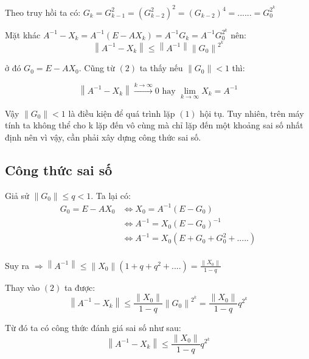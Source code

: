         \par Theo truy hồi ta có: $ G_{k} = G_{k-1}^{2} = (G_{k-2}^2)^2 = (G_{k-2})^4 = ...... = G_{0}^{2^{k}} $
        
        \par Mặt khác $A^{-1} - X_{k} = A^{-1}(E - AX_{k}) = A^{-1}G_{k} = A^{-1}G_0^{2^{k}}$ nên:
        \begin{equation}
            \left\lVert A^{-1} - X_{k} \right\rVert \leq \left\lVert A^{-1} \right\rVert \left\lVert G_{0} \right\rVert ^{2^{k}}
        \end{equation}
        \par ở đó $ G_{0} = E - AX_{0} $. Cũng từ $(2)$ ta thấy nếu $\left\lVert G_{0} \right\rVert < 1 $ thì:

        $$ \left\lVert A^{-1} - X_{k} \right\rVert \xrightarrow{k \to \infty} 0 \text{  hay  } \lim_{k \to \infty} X_{k} = A^{-1}  $$

        Vậy $\left\lVert G_{0} \right\rVert < 1$ là điều kiện để quá trình lặp $(1)$ hội tụ. Tuy nhiên, trên máy tính ta không thể cho k lặp đến vô cùng mà chỉ lặp đến một khoảng sai số nhất định nên vì vậy, cần phải xây dựng công thức sai số.

    \subsection{Công thức sai số}
        Giả sử $ \left\lVert G_{0} \right\rVert \leq q < 1 $. Ta lại có:
        \begin{align*}
            G_{0} = E - AX_{0} &\Leftrightarrow X_{0} = A^{-1}(E - G_{0}) \\
                               &\Leftrightarrow A^{-1} = X_{0}(E - G_{0})^{-1} \\
                               &\Leftrightarrow A^{-1} = X_{0}(E + G_{0} + G_{0}^{2} + .....) \\
        \end{align*} 
        \par Suy ra $ \Rightarrow \left\lVert A^{-1} \right\rVert \leq \left\lVert X_{0} \right\rVert (1 + q + q^{2} + ....) = \frac{\left\lVert X_{0} \right\rVert}{1 - q} $

        \par Thay vào $(2)$ ta được:
        $$ \left\lVert A^{-1} - X_{k} \right\rVert \leq \frac{\left\lVert X_{0} \right\rVert}{1 - q} \left\lVert G_{0} \right\rVert ^{2^{k}} = \frac{\left\lVert X_{0} \right\rVert}{1 - q} q^{2^{k}} $$

        Từ đó ta có công thức đánh giá sai số như sau:
        \begin{equation}
            \left\lVert A^{-1} - X_{k} \right\rVert \leq \frac{\left\lVert X_{0} \right\rVert}{1 - q} q^{2^{k}} 
        \end{equation}
            
